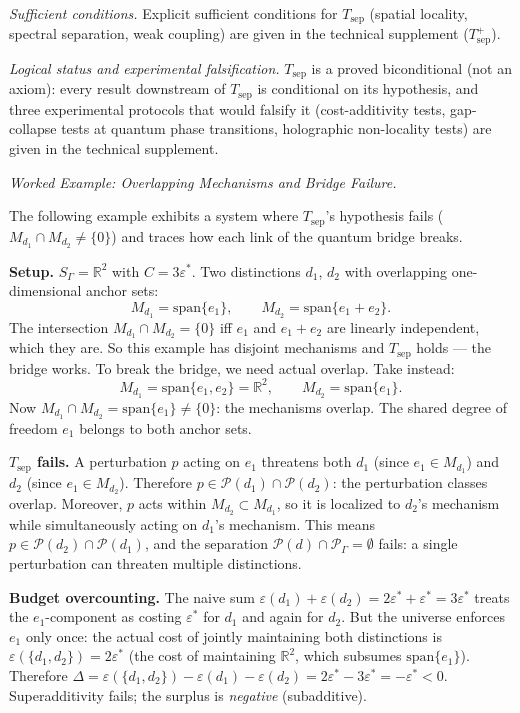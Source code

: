 \documentclass[11pt]{article}
\theoremstyle{remark}
\begin{document}
\smallskip\noindent\textit{Sufficient conditions.}  Explicit sufficient conditions for $T_{\mathrm{sep}}$ (spatial locality, spectral separation, weak coupling) are given in the technical supplement ($T_{\mathrm{sep}}^+$).

\smallskip\noindent\textit{Logical status and experimental falsification.}  $T_{\mathrm{sep}}$ is a proved biconditional (not an axiom): every result downstream of $T_{\mathrm{sep}}$ is conditional on its hypothesis, and three experimental protocols that would falsify it (cost-additivity tests, gap-collapse tests at quantum phase transitions, holographic non-locality tests) are given in the technical supplement.


\medskip\noindent\textit{Worked Example: Overlapping Mechanisms and Bridge Failure.}
\label{box:overlap_example}

The following example exhibits a system where $T_{\mathrm{sep}}$'s hypothesis fails ($M_{d_1} \cap M_{d_2} \ne \{0\}$) and traces how each link of the quantum bridge breaks.

\medskip\noindent\textbf{Setup.}  $S_\Gamma = \mathbb{R}^2$ with $C = 3\varepsilon^*$.  Two distinctions $d_1$, $d_2$ with overlapping one-dimensional anchor sets:
\[
M_{d_1} = \mathrm{span}\{e_1\}, \qquad M_{d_2} = \mathrm{span}\{e_1 + e_2\}.
\]
The intersection $M_{d_1} \cap M_{d_2} = \{0\}$ iff $e_1$ and $e_1 + e_2$ are linearly independent, which they are.  So this example has disjoint mechanisms and $T_{\mathrm{sep}}$ holds --- the bridge works.  To break the bridge, we need actual overlap.  Take instead:
\[
M_{d_1} = \mathrm{span}\{e_1, e_2\} = \mathbb{R}^2, \qquad M_{d_2} = \mathrm{span}\{e_1\}.
\]
Now $M_{d_1} \cap M_{d_2} = \mathrm{span}\{e_1\} \ne \{0\}$: the mechanisms overlap.  The shared degree of freedom $e_1$ belongs to both anchor sets.

\medskip\noindent\textbf{$T_{\mathrm{sep}}$ fails.}  A perturbation $p$ acting on $e_1$ threatens both $d_1$ (since $e_1 \in M_{d_1}$) and $d_2$ (since $e_1 \in M_{d_2}$).  Therefore $p \in \mathcal{P}(d_1) \cap \mathcal{P}(d_2)$: the perturbation classes overlap.  Moreover, $p$ acts within $M_{d_2} \subset M_{d_1}$, so it is localized to $d_2$'s mechanism while simultaneously acting on $d_1$'s mechanism.  This means $p \in \mathcal{P}(d_2) \cap \mathcal{P}(d_1)$, and the separation $\mathcal{P}(d) \cap \mathcal{P}_\Gamma = \emptyset$ fails: a single perturbation can threaten multiple distinctions.

\medskip\noindent\textbf{Budget overcounting.}  The naive sum $\varepsilon(d_1) + \varepsilon(d_2) = 2\varepsilon^* + \varepsilon^* = 3\varepsilon^*$ treats the $e_1$-component as costing $\varepsilon^*$ for $d_1$ and again for $d_2$.  But the universe enforces $e_1$ only once: the actual cost of jointly maintaining both distinctions is $\varepsilon(\{d_1, d_2\}) = 2\varepsilon^*$ (the cost of maintaining $\mathbb{R}^2$, which subsumes $\mathrm{span}\{e_1\}$).  Therefore $\Delta = \varepsilon(\{d_1,d_2\}) - \varepsilon(d_1) - \varepsilon(d_2) = 2\varepsilon^* - 3\varepsilon^* = -\varepsilon^* < 0$.  Superadditivity fails; the surplus is \emph{negative} (subadditive).
\end{document}

